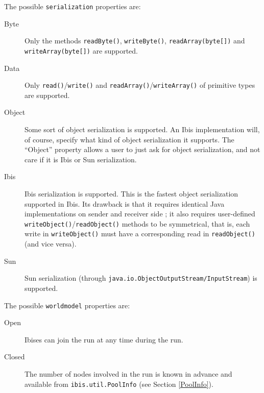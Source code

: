 \documentclass[10pt]{article}
\begin{document}
The possible \texttt{serialization} properties are:
\begin{description}
\item[Byte]
Only the methods \texttt{readByte()}, \texttt{writeByte()}, \texttt{readArray(byte[])} and \texttt{writeArray(byte[])} are supported.
\item[Data]
Only \texttt{read()}/\texttt{write()} and \texttt{readArray()}/\texttt{writeArray()} of primitive types are supported.
\item[Object]
Some sort of object serialization is supported. An Ibis implementation
will, of course, specify what kind of object serialization it supports.
The ``Object'' property allows a user to just ask for object
serialization, and not care if it is Ibis or Sun serialization.
\item[Ibis]
Ibis serialization is supported.
This is the fastest object serialization supported in Ibis. Its drawback
is that it requires identical Java implementations on sender and
receiver side 
; it also requires user-defined
\texttt{writeObject()}/\texttt{readObject()} methods to be symmetrical, that is,
each write in \texttt{writeObject()} must have a corresponding read
in \texttt{readObject()} (and vice versa).
\item[Sun]
Sun serialization (through \texttt{java.io.ObjectOutputStream/InputStream}) is
supported.
\end{description}

\noindent
The possible \texttt{worldmodel} properties are:
\begin{description}
\item[Open]
Ibises can join the run at any time during the run.
\item[Closed]
The number of nodes involved in the run is known in advance and
available from \texttt{ibis.util.PoolInfo} (see Section \ref{PoolInfo}).
\end{description}
\end{document}
